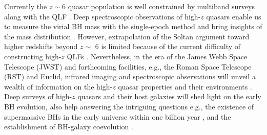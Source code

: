 \documentclass[twocolumn, twocolappendix]{aastex63}
\begin{document}
\begin{CJK*}{UTF8}{gbsn}
Currently the $z\sim 6$ quasar population is well constrained by multiband surveys
\citep{2008AJ....135.1057J,2010AJ....139..906W,2016arXiv161205560C,2018PASJ...70S..35M,2019ApJ...883..183M,2019AJ....157..168D}
along with the QLF \citep[e.g.,][]{2015ApJ...798...28K,2016ApJ...833..222J,2017ApJ...847L..15O,2018ApJ...869..150M}.
Deep spectroscopic observations of high-$z$ quasars enable us to measure the virial BH mass 
with the  single-epoch method and bring insights of the mass distribution
\citep[e.g.,][]{2007AJ....134.1150J,2007ApJ...669...32K,2010AJ....140..546W,2018Natur.553..473B,2019ApJ...880...77O,2019ApJ...873...35S}. 
However, extrapolation of the Soltan argument toward higher redshifts beyond $z\sim$ 6 is limited because of the current difficulty of
constructing high-$z$ QLFs \citep{2013ApJ...768..105M,2016ApJ...829...33Y,2019ApJ...884...30W,2019BAAS...51c.121F}.
Nevertheless, in the era of the James Webb Space Telescope (JWST) and forthcoming facilities,
e.g., the Roman Space Telescope (RST) and Euclid,
infrared imaging and spectroscopic observations will unveil a wealth of information on the
high-$z$ quasar properties and their environments 
\citep{2019BAAS...51c..45R, 2019arXiv190205569A, 2011arXiv1110.3193L}. 
Deep surveys of high-$z$ quasars and their host galaxies will shed light on the early BH evolution, 
also help answering the intriguing questions e.g., 
the existence of supermassive BHs in the early universe within one billion year 
\citep{2012Sci...337..544V,2013ASSL..396..293H,2020ARA&A..58...27I}, 
and the establishment of BH-galaxy coevolution 
\citep[e.g.,][]{2013ApJ...773...44W,2017ApJ...851L...8V,2021ApJ...914...36I,2022ApJ...927..237I,2022MNRAS.511.3751H}.




\end{CJK*}
\end{document}
